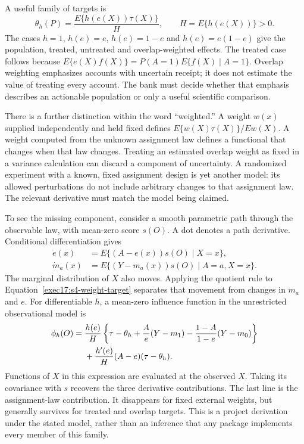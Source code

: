 A useful family of targets is
\begin{equation}
 \theta_h(P)=\frac{E\{h(e(X))\tau(X)\}}{H},\qquad
 H=E\{h(e(X))\}>0.
 \label{exec17:s4-weight-target}
\end{equation}
The cases $h=1$, $h(e)=e$, $h(e)=1-e$ and $h(e)=e(1-e)$ give the population,
treated, untreated and overlap-weighted effects. The treated case follows
because $E\{e(X)f(X)\}=P(A=1)E\{f(X)\mid A=1\}$. Overlap weighting emphasizes
accounts with uncertain receipt; it does not estimate the value of treating
every account. The bank must decide whether that emphasis describes an
actionable population or only a useful scientific comparison.

There is a further distinction within the word ``weighted.'' A weight
$w(x)$ supplied independently and held fixed defines
$E\{w(X)\tau(X)\}/Ew(X)$. A weight computed from the unknown assignment law
defines a functional that changes when that law changes. Treating an estimated
overlap weight as fixed in a variance calculation can discard a component of
uncertainty. A randomized experiment with a known, fixed assignment design is
yet another model: its allowed perturbations do not include arbitrary changes
to that assignment law. The relevant derivative must match the model being
claimed.~\citep{exec17_s4_math,dml2018}

To see the missing component, consider a smooth parametric path through the
observable law, with mean-zero score $s(O)$. A dot denotes a path derivative.
Conditional differentiation gives
\begin{align*}
 \dot e(x)&=E\{(A-e(x))s(O)\mid X=x\},\\
 \dot m_a(x)&=E\{(Y-m_a(x))s(O)\mid A=a,X=x\}.
\end{align*}
The marginal distribution of $X$ also moves. Applying the quotient rule to
Equation~\eqref{exec17:s4-weight-target} separates that movement from changes
in $m_a$ and $e$. For differentiable $h$, a mean-zero influence function in
the unrestricted observational model is
\begin{align}
 \phi_h(O)={}&\frac{h(e)}{H}
 \left\{\tau-\theta_h+\frac{A}{e}(Y-m_1)
                 -\frac{1-A}{1-e}(Y-m_0)\right\}\notag\\
 &+\frac{h'(e)}{H}(A-e)(\tau-\theta_h).
 \label{exec17:s4-weight-if}
\end{align}
Functions of $X$ in this expression are evaluated at the observed $X$.
Taking its covariance with $s$ recovers the three derivative contributions.
The last line is the assignment-law contribution. It disappears for fixed
external weights, but generally survives for treated and overlap targets.
This is a project derivation under the stated model, rather than an inference
that any package implements every member of this family.~\citep{exec17_s4_math}

